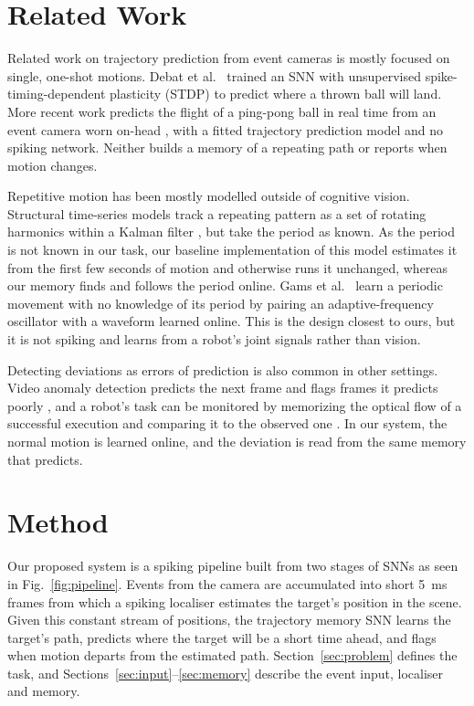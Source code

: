 \documentclass[conference]{IEEEtran}
\begin{document}
\section{Related Work}
\label{sec:related}
Related work on trajectory prediction from event cameras is mostly focused on single, one-shot motions. Debat et al.~\cite{Debat2021Event} trained an SNN with unsupervised spike-timing-dependent plasticity (STDP) to predict where a thrown ball will land. More recent work predicts the flight of a ping-pong ball in real time from an event camera worn on-head \cite{Alberico2025Egocentric}, with a fitted trajectory prediction model and no spiking network. Neither builds a memory of a repeating path or reports when motion changes.

Repetitive motion has been mostly modelled outside of cognitive vision. Structural time-series models track a repeating pattern as a set of rotating harmonics within a Kalman filter \cite{Harvey1990Forecasting}, but take the period as known. As the period is not known in our task, our baseline implementation of this model estimates it from the first few seconds of motion and otherwise runs it unchanged, whereas our memory finds and follows the period online. Gams et al.~\cite{Gams2009On} learn a periodic movement with no knowledge of its period by pairing an adaptive-frequency oscillator with a waveform learned online. This is the design closest to ours, but it is not spiking and learns from a robot's joint signals rather than vision.

Detecting deviations as errors of prediction is also common in other settings. Video anomaly detection predicts the next frame and flags frames it predicts poorly \cite{Xu2022Motion}, and a robot's task can be monitored by memorizing the optical flow of a successful execution and comparing it to the observed one \cite{Thoduka2021Using}. In our system, the normal motion is learned online, and the deviation is read from the same memory that predicts.

\section{Method}
\label{sec:method}

Our proposed system is a spiking pipeline built from two stages of SNNs as seen in Fig.~\ref{fig:pipeline}. Events from the camera are accumulated into short 5~ms frames from which a spiking localiser estimates the target's position in the scene. Given this constant stream of positions, the trajectory memory SNN learns the target's path, predicts where the target will be a short time ahead, and flags when motion departs from the estimated path. Section~\ref{sec:problem} defines the task, and Sections~\ref{sec:input}--\ref{sec:memory} describe the event input, localiser and memory.
\end{document}
